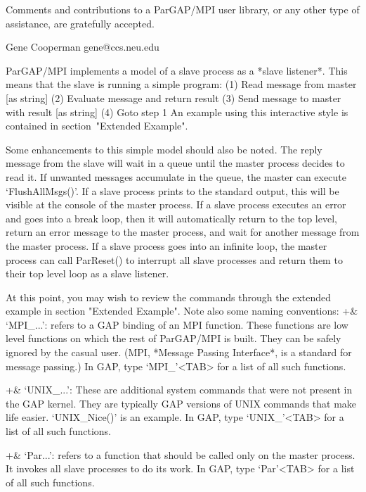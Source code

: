 Comments and contributions to a ParGAP/MPI user library, or any other type
of assistance, are gratefully accepted.

                                                        Gene Cooperman
                                                        gene@ccs.neu.edu



ParGAP/MPI implements a model of a slave process as a *slave listener*.
This means that the slave is running a simple program:
\begintt
  (1) Read message from master [as string]
  (2) Evaluate message and return result
  (3) Send message to master with result [as string]
  (4) Goto step 1
\endtt
An example using this interactive style is contained in
section~"Extended Example".

Some enhancements to this simple model should also be noted.  The reply
message from the slave will wait in a queue until the master process
decides to read it.  If unwanted messages accumulate in the queue,
the master can execute `FlushAllMsgs()'.  If a slave process prints
to the standard output, this will be visible at the console of the
master process.  If a slave process executes an error and goes into a
break loop, then it will automatically return to the top level, return
an error message to the master process, and wait for another message
from the master process.  If a slave process goes into an infinite loop,
the master process can call ParReset() to interrupt all slave processes
and return them to their top level loop as a slave listener.

At this point, you may wish to review the commands through the
extended example in section "Extended Example".  Note also some
naming conventions:
\beginitems
+& `MPI_...':  refers to a GAP binding of an MPI function.  These
functions are low level functions on which the rest of ParGAP/MPI is
built.  They can be safely ignored by the casual user.  (MPI, *Message
Passing Interface*, is a standard for message passing.)  In
GAP, type `MPI_'<TAB> for a list of all such functions.

+& `UNIX_...':  These are additional system commands that were not
present in the GAP kernel.  They are typically GAP versions of UNIX
commands that make life easier.  `UNIX_Nice()' is an example.  In
GAP, type `UNIX_'<TAB> for a list of all such functions.

+& `Par...':  refers to a function that should be called only on the
master process.  It invokes all slave processes to do its work.  In
GAP, type `Par'<TAB> for a list of all such functions.
\enditems

